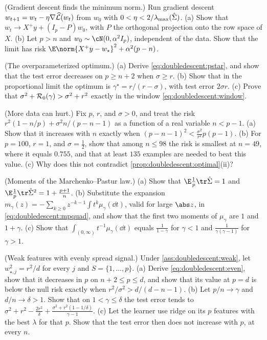 \begin{refsection}
\begin{exercises}
\item \consolidation (Gradient descent finds the minimum norm.) Run gradient descent $w_{t+1}=w_t-\eta\nabla\widehat{\mathcal{L}}(w_t)$ from $w_0$ with $0<\eta<2/\lambda_{\max}(\hat\Sigma)$. (a) Show that $w_t\to X^+y+(I_p-P)w_0$, with $P$ the orthogonal projection onto the row space of $X$. (b) Let $p>n$ and $w_0\sim\cN(0,\alpha^2I_p)$, independent of the data. Show that the limit has risk $\E\norm{X^+y-w_\star}^2+\alpha^2(p-n)$.\label{ex:doubledescent:gd}

\item \consolidation (The overparameterized optimum.) (a) Derive \eqref{eq:doubledescent:pstar}, and show that the test error decreases on $p\ge n+2$ when $\sigma\ge r$. (b) Show that in the proportional limit the optimum is $\gamma^\star=r/(r-\sigma)$, with test error $2\sigma r$. (c) Prove that $\sigma^2+\mathcal{R}_0(\gamma)>\sigma^2+r^2$ exactly in the window \eqref{eq:doubledescent:window}.\label{ex:doubledescent:optimum}

\item \consolidation (More data can hurt.) Fix $p$, $r$, and $\sigma>0$, and treat the risk $r^2(1-n/p)+\sigma^2n/(p-n-1)$ as a function of a real variable $n<p-1$. (a) Show that it increases with $n$ exactly when $(p-n-1)^2<\frac{\sigma^2}{r^2}p(p-1)$. (b) For $p=100$, $r=1$, and $\sigma=\frac12$, show that among $n\le98$ the risk is smallest at $n=49$, where it equals $0.755$, and that at least $135$ examples are needed to beat this value. (c) Why does this not contradict \cref{prop:doubledescent:optimal}(ii)?\label{ex:doubledescent:samplewise}

\item \consolidation (Moments of the Marchenko--Pastur law.) (a) Show that $\E\frac1p\tr\hat\Sigma=1$ and $\E\frac1p\tr\hat\Sigma^2=1+\frac{p+1}n$. (b) Substitute the expansion $m_\gamma(z)=-\sum_{k\ge0}z^{-k-1}\int t^k\mu_\gamma(\dd t)$, valid for large $\abs z$, in \eqref{eq:doubledescent:mpquad}, and show that the first two moments of $\mu_\gamma$ are $1$ and $1+\gamma$. (c) Show that $\int_{(0,\infty)}t^{-1}\mu_\gamma(\dd t)$ equals $\frac1{1-\gamma}$ for $\gamma<1$ and $\frac1{\gamma(\gamma-1)}$ for $\gamma>1$. \label{ex:doubledescent:moments}

\item \variation (Weak features with evenly spread signal.) Under \cref{ass:doubledescent:weak}, let $w_{\star,j}^2=r^2/d$ for every $j$ and $S=\{1,\dots,p\}$. (a) Derive \eqref{eq:doubledescent:even}, show that it decreases in $p$ on $n+2\le p\le d$, and show that its value at $p=d$ is below the null risk exactly when $r^2/\sigma^2>d/(d-n-1)$. (b) Let $p/n\to\gamma$ and $d/n\to\delta>1$. Show that on $1<\gamma\le\delta$ the test error tends to $\sigma^2+r^2-\frac{2r^2}\delta+\frac{\sigma^2+r^2(1-1/\delta)}{\gamma-1}$. (c) Let the learner use ridge on its $p$ features with the best $\lambda$ for that $p$. Show that the test error then does not increase with $p$, at every $n$. \label{ex:doubledescent:even}


\end{exercises}
\end{refsection}
